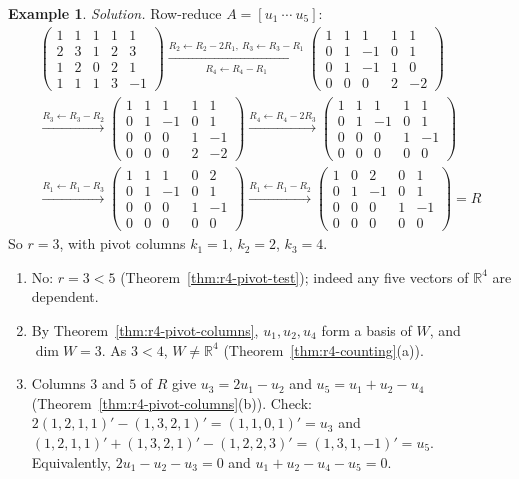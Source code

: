 \documentclass[12pt]{article}
\newcommand{\R}{\mathbb R}
\theoremstyle{definition}
\newtheorem{example}[theorem]{Example}
\begin{document}
\begin{example}
\textit{Solution.} Row-reduce \(A=[u_1\ \cdots\ u_5]\):
\[
\begin{gathered}
\begin{pmatrix}1&1&1&1&1\\2&3&1&2&3\\1&2&0&2&1\\1&1&1&3&-1\end{pmatrix}
\xrightarrow[R_4\leftarrow R_4-R_1]{R_2\leftarrow R_2-2R_1,\ R_3\leftarrow R_3-R_1}
\begin{pmatrix}1&1&1&1&1\\0&1&-1&0&1\\0&1&-1&1&0\\0&0&0&2&-2\end{pmatrix}
\\
\xrightarrow{R_3\leftarrow R_3-R_2}
\begin{pmatrix}1&1&1&1&1\\0&1&-1&0&1\\0&0&0&1&-1\\0&0&0&2&-2\end{pmatrix}
\xrightarrow{R_4\leftarrow R_4-2R_3}
\begin{pmatrix}1&1&1&1&1\\0&1&-1&0&1\\0&0&0&1&-1\\0&0&0&0&0\end{pmatrix}
\\
\xrightarrow{R_1\leftarrow R_1-R_3}
\begin{pmatrix}1&1&1&0&2\\0&1&-1&0&1\\0&0&0&1&-1\\0&0&0&0&0\end{pmatrix}
\xrightarrow{R_1\leftarrow R_1-R_2}
\begin{pmatrix}1&0&2&0&1\\0&1&-1&0&1\\0&0&0&1&-1\\0&0&0&0&0\end{pmatrix}=R
\end{gathered}
\]
So \(r=3\), with pivot columns \(k_1=1\), \(k_2=2\), \(k_3=4\).
\begin{enumerate}
\item No: \(r=3<5\) (Theorem~\ref{thm:r4-pivot-test}); indeed any five vectors of \(\R^4\) are
dependent.
\item By Theorem~\ref{thm:r4-pivot-columns}, \(u_1,u_2,u_4\) form a basis of \(W\), and
\(\dim W=3\). As \(3<4\), \(W\neq\R^4\) (Theorem~\ref{thm:r4-counting}(a)).
\item Columns \(3\) and \(5\) of \(R\) give \(u_3=2u_1-u_2\) and \(u_5=u_1+u_2-u_4\)
(Theorem~\ref{thm:r4-pivot-columns}(b)). Check:
\(2(1,2,1,1)'-(1,3,2,1)'=(1,1,0,1)'=u_3\) and
\((1,2,1,1)'+(1,3,2,1)'-(1,2,2,3)'=(1,3,1,-1)'=u_5\). Equivalently,
\(2u_1-u_2-u_3=0\) and \(u_1+u_2-u_4-u_5=0\).
\end{enumerate}
\end{example}
\end{document}
